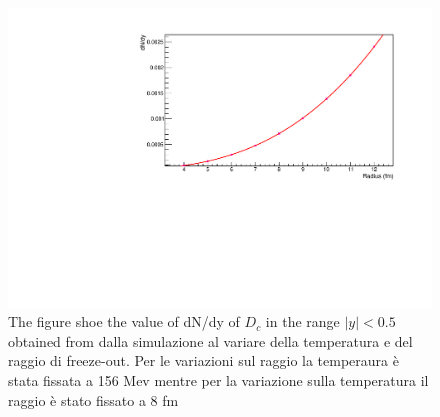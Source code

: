 \documentclass[12pt,a4paper]{book}
\begin{document}
		\begin{figure}
		\includegraphics[width=0.8 \linewidth]{pictures/var_radius.pdf}
		\caption{The figure shoe the value of dN/dy of $D_c$ in the range $|y|<0.5$ obtained from dalla simulazione al variare della temperatura e del raggio di freeze-out. Per le variazioni sul raggio la temperaura è stata fissata a 156 Mev mentre per la variazione sulla temperatura il raggio è stato fissato a 8 fm}
		\label{fig:var_radius}
	\end{figure}
	
\end{document}
